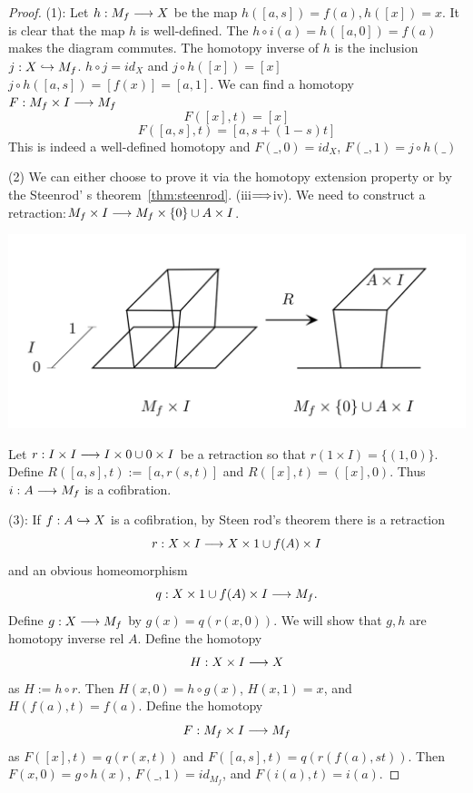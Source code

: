 \documentclass[11pt]{book} %
\begin{document}
\begin{proof}
(1): Let $h: M_f\longrightarrow X$ be the map $h([a,s])=f(a), h([x])=x$. It is clear that the map $h$ is well-defined. The $h\circ i(a)=h([a,0])=f(a)$ makes the diagram commutes. The homotopy inverse of $h$ is the inclusion $j: X\hookrightarrow M_f$. $h\circ j=id_X$ and $j\circ h([x])=[x]$ $j\circ h ([a,s])=[f(x)]=[a,1]$. We can find a homotopy $F:M_f\times I\longrightarrow M_f$
$$
F([x],t)=[x]
$$
$$
F([a,s],t)=[a,s+(1-s)t]
$$
This is indeed a well-defined homotopy and $F(\_, 0)=id_X$, $F(\_, 1)=j\circ h(\_)$

(2) We can either choose to prove it via the homotopy extension property or by the Steenrod' s theorem~\ref{thm:steenrod}. (iii$\Longrightarrow $iv). We need to construct a retraction:$M_f\times I\longrightarrow M_f\times \{0\}\cup A\times I$.
\begin{center}
\includegraphics[scale=0.5]{retraction}
\end{center}
Let $r: I\times I\longrightarrow I\times 0\cup 0\times I$ be a retraction so that $r(1\times I)=\{(1,0)\}$. Define $R([a,s],t):=[a,r(s,t)]$ and $R([x],t)=([x],0)$. Thus $i: A\longrightarrow M_f$ is a cofibration.

(3): If $f: A\hookrightarrow X$ is a cofibration, by Steen rod's theorem there is a retraction
$$
r: X\times I\longrightarrow X\times 1\cup f(A)\times I
$$
and an obvious homeomorphism
$$
q: X\times 1\cup f(A)\times I\longrightarrow M_f.
$$
Define $g: X\longrightarrow M_f$ by $g(x)=q(r(x,0))$. We will show that $g,h$ are homotopy inverse rel $A$. Define the homotopy
$$
H: X\times I\longrightarrow X
$$
as $H:=h\circ r$. Then $H(x,0)=h\circ g(x)$, $H(x,1)=x$, and $H(f(a),t)=f(a)$. Define the homotopy
$$
F:M_f\times I\longrightarrow M_f
$$
as $F([x],t)=q(r(x,t))$ and $F([a,s],t)=q(r(f(a),st))$. Then $F(x,0)=g\circ h(x)$, $F(\_, 1)=id_{M_f}$, and $F(i(a),t)=i(a).$ 
\end{proof}
\end{document}
